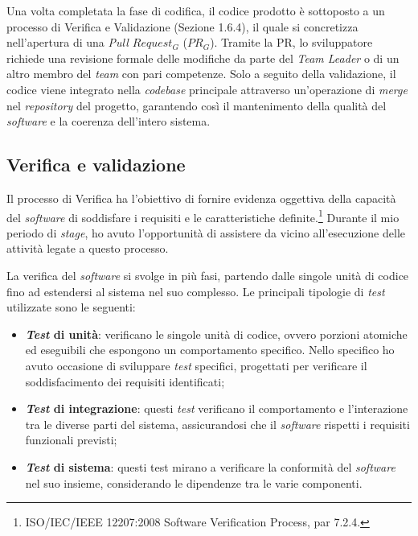        \vspace{0.2 em}
        \noindent Una volta completata la fase di codifica, il codice prodotto è sottoposto a un processo di Verifica e Validazione (Sezione 1.6.4), il quale si concretizza nell'apertura di una \textit{Pull $Request_G$} ($PR_G$). Tramite la PR, lo sviluppatore richiede una revisione formale delle modifiche da parte del \textit{Team Leader} o di un altro membro del \textit{team} con pari competenze. Solo a seguito della validazione, il codice viene integrato nella \textit{codebase} principale attraverso un'operazione di \textit{merge} nel \textit{repository} del progetto, garantendo così il mantenimento della qualità del \textit{software} e la coerenza dell’intero sistema.

        
        \subsection{Verifica e validazione}
        Il processo di Verifica ha l’obiettivo di fornire evidenza oggettiva della capacità del \textit{software} di soddisfare i requisiti e le caratteristiche definite.\footnote{ISO/IEC/IEEE 12207:2008 Software Verification Process, par 7.2.4.} Durante il mio periodo di \textit{stage}, ho avuto l'opportunità di assistere da vicino all'esecuzione delle attività legate a questo processo.

        \vspace{0.2 em}
        \noindent La verifica del \textit{software} si svolge in più fasi, partendo dalle singole unità di codice fino ad estendersi al sistema nel suo complesso. Le principali tipologie di \textit{test} utilizzate sono le seguenti:
        \begin{itemize}
        \item \textbf{\textit{Test} di unità}: verificano le singole unità di codice, ovvero porzioni atomiche ed eseguibili che espongono un comportamento specifico. Nello specifico ho avuto occasione di sviluppare \textit{test} specifici, progettati per verificare il soddisfacimento dei requisiti identificati;

        \item \textbf{\textit{Test} di integrazione}: questi \textit{test} verificano il comportamento e l'interazione tra le diverse parti del sistema, assicurandosi che il \textit{software} rispetti i requisiti funzionali previsti;

        \item \textbf{\textit{Test} di sistema}: questi test mirano a verificare la conformità del \textit{software} nel suo insieme, considerando le dipendenze tra le varie componenti.
        \end{itemize}

